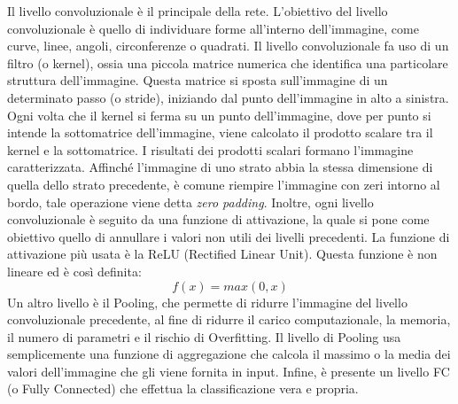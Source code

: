 {Il livello convoluzionale è il principale della rete. 
\newline
L'obiettivo del livello convoluzionale è quello di individuare forme all'interno dell'immagine, come curve, linee, angoli, circonferenze o quadrati. Il livello convoluzionale fa uso di un filtro (o kernel), ossia una piccola matrice numerica che identifica una particolare struttura dell'immagine. Questa matrice si sposta sull'immagine di un determinato passo (o stride), iniziando dal punto dell'immagine in alto a sinistra.
\newline
Ogni volta che il kernel si ferma su un punto dell'immagine, dove per punto si intende la sottomatrice dell'immagine, viene calcolato il prodotto scalare tra il kernel e la sottomatrice. 
\newline
I risultati dei prodotti scalari formano l'immagine caratterizzata. Affinché l'immagine di uno strato abbia la stessa dimensione di quella dello strato precedente, è comune riempire l'immagine con zeri intorno al bordo, tale operazione viene detta \textit{zero padding}. 
\newline
Inoltre, ogni livello convoluzionale è seguito da una funzione di attivazione, la quale si pone come obiettivo quello di annullare i valori non utili dei livelli precedenti. 
\newline
La funzione di attivazione più usata è la ReLU (Rectified Linear Unit)\cite{agarap2018deep}. Questa funzione è non lineare ed è così definita: 
\begin{equation}
    f(x) = max(0,x)
\end{equation}
Un altro livello è il Pooling, che permette di ridurre l'immagine del livello convoluzionale precedente, al fine di ridurre il carico computazionale, la memoria, il numero di parametri e il rischio di Overfitting.
\newline
Il livello di Pooling usa semplicemente una funzione di aggregazione che calcola il massimo o la media dei valori dell'immagine che gli viene fornita in input.
\newline
Infine, è presente un livello FC (o Fully Connected) che effettua la classificazione vera e propria. \cite{Senn:2015}
\newpage
}
